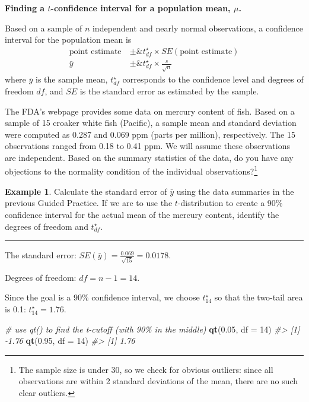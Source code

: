 \documentclass[
  10pt,
  openany]{book}
\newenvironment{Shaded}{\begin{snugshade}}{\end{snugshade}}
\newcommand{\AttributeTok}[1]{\textcolor[rgb]{0.13,0.29,0.53}{#1}}
\newcommand{\CommentTok}[1]{\textcolor[rgb]{0.56,0.35,0.01}{\textit{#1}}}
\newcommand{\DecValTok}[1]{\textcolor[rgb]{0.00,0.00,0.81}{#1}}
\newcommand{\FloatTok}[1]{\textcolor[rgb]{0.00,0.00,0.81}{#1}}
\newcommand{\FunctionTok}[1]{\textcolor[rgb]{0.13,0.29,0.53}{\textbf{#1}}}
\newcommand{\NormalTok}[1]{#1}
\theoremstyle{definition}
\theoremstyle{definition}
\newtheorem{example}{Example}[chapter]
\theoremstyle{definition}
\theoremstyle{definition}
\theoremstyle{remark}
\begin{document}

\textbf{Finding a \(t\)-confidence interval for a population mean, \(\mu\).}

Based on a sample of \(n\) independent and nearly normal
observations, a confidence interval for the population
mean is
\begin{align*}
  \text{point estimate} \ &\pm\&  t^{\star}_{df} \times SE(\text{point estimate})\\
  \bar{y} \ &\pm\&  t^{\star}_{df} \times \frac{s}{\sqrt{n}}
  \end{align*}
where \(\bar{y}\) is the sample mean, \(t^{\star}_{df}\)
corresponds to the confidence level and degrees of freedom
\(df\), and \(SE\) is the standard error as estimated by
the sample.

The FDA's webpage provides some data on mercury content of fish.
Based on a sample of 15 croaker white fish (Pacific), a sample mean and standard deviation were computed as 0.287 and 0.069 ppm (parts per million), respectively.
The 15 observations ranged from 0.18 to 0.41 ppm. We will assume these observations are independent.
Based on the summary statistics of the data, do you have any objections to the normality condition of the individual observations?\footnote{The sample size is under 30, so we check for obvious outliers: since all observations are within 2 standard deviations of the mean, there are no such clear outliers.}


\begin{example}
Calculate the standard error of
\(\bar{y}\) using the data summaries in the previous Guided Practice. If we are to use the \(t\)-distribution to create a
90\% confidence interval for the actual mean of the
mercury content, identify the degrees of freedom
and \(t^{\star}_{df}\).

\begin{center}\rule{0.5\linewidth}{0.5pt}\end{center}

The standard error: \(SE(\bar{y}) = \frac{0.069}{\sqrt{15}} = 0.0178\).

Degrees of freedom: \(df = n - 1 = 14\).

Since the goal is a 90\% confidence interval,
we choose \(t_{14}^{\star}\) so that the two-tail area
is 0.1:
\(t^{\star}_{14} = 1.76\).
\end{example}

\begin{Shaded}
\begin{Highlighting}[]
\CommentTok{\# use qt() to find the t{-}cutoff (with 90\% in the middle)}
\FunctionTok{qt}\NormalTok{(}\FloatTok{0.05}\NormalTok{, }\AttributeTok{df =} \DecValTok{14}\NormalTok{)}
\CommentTok{\#\textgreater{} [1] {-}1.76}
\FunctionTok{qt}\NormalTok{(}\FloatTok{0.95}\NormalTok{, }\AttributeTok{df =} \DecValTok{14}\NormalTok{)}
\CommentTok{\#\textgreater{} [1] 1.76}
\end{Highlighting}
\end{Shaded}
\end{document}
